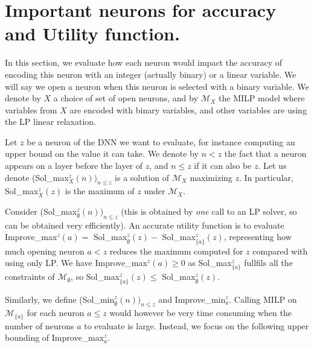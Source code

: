 \section{Important neurons for accuracy and Utility function.}

In this section, we evaluate how each neuron would impact the accuracy of encoding this neuron with an integer (actually binary) or a linear variable. We will say we open a neuron when this neuron is selected with a binary variable. We denote by $X$ a choice of set of open neurons, and by $\mathcal{M}_X$ the MILP model where variables from $X$ are encoded with binary variables, and other variables are using the LP linear relaxation.

Let $z$ be a neuron of the DNN we want to evaluate, for instance computing an upper bound on the value it can take. We denote by $n< z$ the fact that a neuron appears on a layer before the layer of $z$, and $n \leq z$ if it can also be $z$.
Let us denote (Sol\_max$_X^z(n))_{n \leq z}$ is a solution of $\mathcal{M}_X$ 
maximizing $z$. In particular, Sol\_max$_X^z(z)$ is the maximum of $z$ under $\mathcal{M}_X$.

Consider (Sol\_max$_\emptyset^z(n))_{n \leq z}$ (this is obtained by {\em one} call to an LP solver, so can be obtained very efficiently).
An accurate utility function is to evaluate 
Improve\_max$^z(a)=$ Sol\_max$_\emptyset^z(z) -$ Sol\_max$_{\{a\}}^z(z)$, 
representing how much opening neuron $a < z$ reduces the maximum computed for $z$
compared with using only LP. 
We have Improve\_max$^z(a)\geq 0$ as Sol\_max$_{\{a\}}^z$ fullfils all the constraints of 
$\mathcal{M}_\emptyset$, so Sol\_max$_{\{a\}}^z(z) \leq$ Sol\_max$_\emptyset^z(z)$.

Similarly, we define (Sol\_min$_\emptyset^z(n))_{n \leq z}$ and 
Improve\_min$_a^z$. Calling MILP on $\mathcal{M}_{\{a\}}$ for each neuron $a \leq z$
would however be very time consuming when the number of neurons $a$ to evaluate is large.
Instead, we focus on the following upper bounding of Improve\_max$_a^z$.









